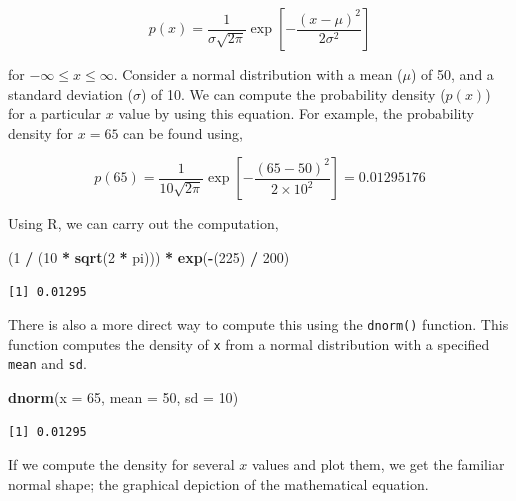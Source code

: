 \documentclass[]{book}
\newenvironment{Shaded}{\begin{snugshade}}{\end{snugshade}}
\newcommand{\DataTypeTok}[1]{\textcolor[rgb]{0.13,0.29,0.53}{#1}}
\newcommand{\DecValTok}[1]{\textcolor[rgb]{0.00,0.00,0.81}{#1}}
\newcommand{\KeywordTok}[1]{\textcolor[rgb]{0.13,0.29,0.53}{\textbf{#1}}}
\newcommand{\NormalTok}[1]{#1}
\newcommand{\OperatorTok}[1]{\textcolor[rgb]{0.81,0.36,0.00}{\textbf{#1}}}
\newcommand{\StringTok}[1]{\textcolor[rgb]{0.31,0.60,0.02}{#1}}
\begin{document}
\[
p(x) = \frac{1}{\sigma\sqrt{2\pi}}\exp\left[-\frac{(x-\mu)^2}{2\sigma^2}\right]
\]

for \(-\infty \leq x \leq \infty\). Consider a normal distribution with a mean (\(\mu\)) of 50, and a standard deviation (\(\sigma\)) of 10. We can compute the probability density (\(p(x)\)) for a particular \(x\) value by using this equation. For example, the probability density for \(x=65\) can be found using,

\[
p(65) = \frac{1}{10\sqrt{2\pi}}\exp\left[-\frac{(65-50)^2}{2\times10^2}\right] = 0.01295176
\]

Using R, we can carry out the computation,

\begin{Shaded}
\begin{Highlighting}[]
\NormalTok{(}\DecValTok{1} \OperatorTok{/}\StringTok{ }\NormalTok{(}\DecValTok{10} \OperatorTok{*}\StringTok{ }\KeywordTok{sqrt}\NormalTok{(}\DecValTok{2} \OperatorTok{*}\StringTok{ }\NormalTok{pi))) }\OperatorTok{*}\StringTok{ }\KeywordTok{exp}\NormalTok{(}\OperatorTok{-}\NormalTok{(}\DecValTok{225}\NormalTok{) }\OperatorTok{/}\StringTok{ }\DecValTok{200}\NormalTok{)}
\end{Highlighting}
\end{Shaded}

\begin{verbatim}
[1] 0.01295
\end{verbatim}

There is also a more direct way to compute this using the \texttt{dnorm()} function. This function computes the density of \texttt{x} from a normal distribution with a specified \texttt{mean} and \texttt{sd}.

\begin{Shaded}
\begin{Highlighting}[]
\KeywordTok{dnorm}\NormalTok{(}\DataTypeTok{x =} \DecValTok{65}\NormalTok{, }\DataTypeTok{mean =} \DecValTok{50}\NormalTok{, }\DataTypeTok{sd =} \DecValTok{10}\NormalTok{)}
\end{Highlighting}
\end{Shaded}

\begin{verbatim}
[1] 0.01295
\end{verbatim}

If we compute the density for several \(x\) values and plot them, we get the familiar normal shape; the graphical depiction of the mathematical equation.
\end{document}
